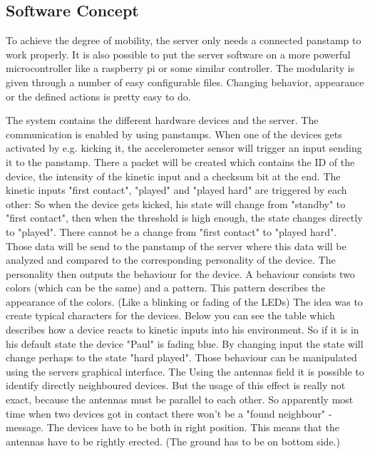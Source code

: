 \subsection{Software Concept} 

To achieve the degree of mobility, the server only needs a connected panstamp to work properly. It is also possible to put the server software on a more powerful microcontroller like a raspberry pi or some similar controller.
The modularity is given through a number of easy configurable files. Changing behavior, appearance or the defined actions is pretty easy to do.

The system contains the different hardware devices and the server. The communication is enabled by using panstamps. When one of the devices gets activated by e.g. kicking it, the accelerometer sensor will trigger an input sending it to the panstamp. There a packet will be created which contains the ID of the device, the intensity of the kinetic input and a checksum bit at the end.
The kinetic inputs "first contact", "played" and "played hard" are triggered by each other:
So when the device gets kicked, his state will change from "standby" to "first contact", then when the threshold is high enough, the state changes directly to "played". There cannot be a change from "first contact" to "played hard". 
\newline
\newline
Those data will be send to the panstamp of the server where this data will be analyzed and compared to the corresponding personality of the device. The personality then outputs the behaviour for the device. A behaviour consists two colors (which can be the same) and a pattern. This pattern describes the appearance of the colors. (Like a blinking or fading of the LEDs)
The idea was to create typical characters for the devices. Below you can see the table which describes how a device reacts to kinetic inputs into his environment. So if it is in his default state the device "Paul" is fading blue. By changing input the state will change perhaps to the state "hard played". Those behaviour can be manipulated using the servers graphical interface. The 
\newline
\newline
Using the antennas field  it is possible to identify directly neighboured devices. But the usage of this effect is really not exact, because the antennas must be parallel to each other. So apparently most time when two devices got in contact there won't be a "found neighbour" - message. The devices have to be both in right position. This means that the antennas have to be rightly erected. (The ground has to be on bottom side.)   
